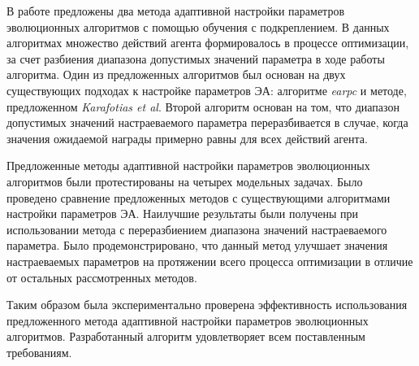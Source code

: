 \startconclusionpage

В работе предложены два метода адаптивной настройки параметров эволюционных алгоритмов с помощью обучения с подкреплением. В данных алгоритмах множество действий агента формировалось в процессе оптимизации, за счет разбиения диапазона допустимых значений параметра в ходе работы алгоритма. Один из предложенных алгоритмов был основан на двух существующих подходах к настройке параметров ЭА: алгоритме \textit{earpc} и методе, предложенном \textit{Karafotias et al}. Второй алгоритм основан на том, что диапазон допустимых значений настраеваемого параметра переразбивается в случае, когда значения ожидаемой награды примерно равны для всех действий агента. 

Предложенные методы адаптивной настройки параметров эволюционных алгоритмов были протестированы на четырех модельных задачах. Было проведено сравнение предложенных методов с существующими алгоритмами настройки параметров ЭА. Наилучшие результаты были получены при использовании метода с переразбиением диапазона значений настраеваемого параметра. Было продемонстрировано, что данный метод улучшает значения настраеваемых параметров на протяжении всего процесса оптимизации в отличие от остальных рассмотренных методов.

Таким образом была экспериментально проверена эффективность использования предложенного метода адаптивной настройки параметров эволюционных алгоритмов. Разработанный алгоритм удовлетворяет всем поставленным требованиям.
